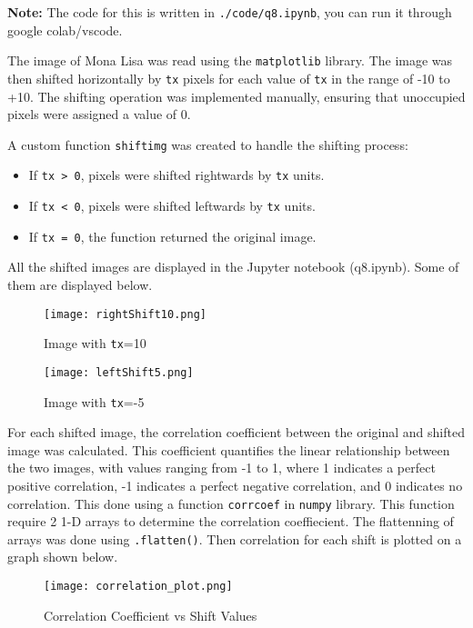 \begin{tcolorbox}[breakable]
	\begin{sol}
		\textbf{Note: } The code for this is written in
		\texttt{./code/q8.ipynb}, you can run it through google
		colab/vscode.

		The image of Mona Lisa was read using the \texttt{matplotlib}
		library. The image was then shifted horizontally by \texttt{tx}
		pixels for each value of \texttt{tx} in the range of -10 to
		+10. The shifting operation was implemented manually, ensuring
		that unoccupied pixels were assigned a value of 0.

		A custom function \texttt{shiftimg} was created to handle the
		shifting process:
		\begin{itemize}
			\item If \texttt{tx > 0}, pixels were shifted
			      rightwards by \texttt{tx} units.
			\item If \texttt{tx < 0}, pixels were shifted leftwards
			      by \texttt{tx} units.
			\item If \texttt{tx = 0}, the function returned the
			      original image.
		\end{itemize}
		All the shifted images are displayed in the Jupyter notebook
		(q8.ipynb). Some of them are displayed below. \begin{figure}[H]
			\centering
			\begin{minipage}{0.345\textwidth}
				\centering
				\texttt{[image: rightShift10.png]}
				\caption{Image with \texttt{tx}=10}
				\label{fig:rightShift}
			\end{minipage}
			\begin{minipage}{0.35\textwidth}
				\centering
				\texttt{[image: leftShift5.png]}
				\caption{Image with \texttt{tx}=-5}
				\label{fig:leftShift}
			\end{minipage}
		\end{figure}


		For each shifted image, the correlation coefficient between the
		original and shifted image was calculated. This coefficient
		quantifies the linear relationship between the two images, with
		values ranging from -1 to 1, where 1 indicates a perfect
		positive correlation, -1 indicates a perfect negative
		correlation, and 0 indicates no correlation. This done using a
		function \texttt{corrcoef} in \texttt{numpy} library. This
		function require 2 1-D arrays to determine the correlation
		coeffiecient. The flattenning of arrays was done using
		\texttt{.flatten()}. Then correlation for each shift is plotted
		on a graph shown below.
		\begin{figure}[H]
			\centering
			\texttt{[image: correlation\_plot.png]}
			\caption{Correlation Coefficient vs Shift Values}
			\label{fig:corr_plot}
		\end{figure}



\end{sol}
\end{tcolorbox}
